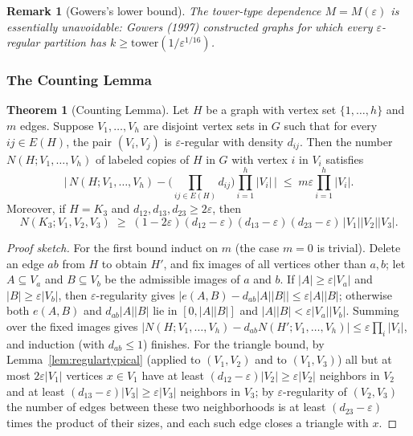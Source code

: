 \documentclass{article}
\newtheorem{remark}{Remark}
\theoremstyle{definition}
\newtheorem{theorem}{Theorem}
\begin{document}
\begin{remark}[Gowers's lower bound]
The tower-type dependence $M = M(\varepsilon)$ is essentially unavoidable:
Gowers (1997) constructed graphs for which every $\varepsilon$-regular
partition has $k \ge \mathrm{tower}(1/\varepsilon^{1/16})$.
\end{remark}

\subsubsection{The Counting Lemma}

\begin{theorem}[Counting Lemma]\label{thm:counting}
Let $H$ be a graph with vertex set $\{1, \dots, h\}$ and $m$ edges.
Suppose $V_1, \dots, V_h$ are disjoint vertex sets in $G$ such that for every
$ij \in E(H)$, the pair $(V_i, V_j)$ is $\varepsilon$-regular with density
$d_{ij}$. Then the number $N(H; V_1, \dots, V_h)$ of labeled copies of $H$
in $G$ with vertex $i$ in $V_i$ satisfies
\[
  \Bigg|\, N(H; V_1, \dots, V_h) -
     \Bigg( \prod_{ij \in E(H)} d_{ij} \Bigg) \prod_{i = 1}^{h} |V_i| \,\Bigg|
  \;\le\; m \varepsilon \prod_{i = 1}^{h} |V_i|.
\]
Moreover, if $H = K_3$ and $d_{12}, d_{13}, d_{23} \ge 2\varepsilon$, then
\[
  N(K_3; V_1, V_2, V_3) \;\ge\; (1 - 2\varepsilon)(d_{12} - \varepsilon)
     (d_{13} - \varepsilon)(d_{23} - \varepsilon)\, |V_1||V_2||V_3|.
\]
\end{theorem}

\begin{proof}[Proof sketch]
For the first bound induct on $m$ (the case $m = 0$ is trivial). Delete an
edge $ab$ from $H$ to obtain $H'$, and fix images of all vertices other
than $a, b$; let $A \subseteq V_a$ and $B \subseteq V_b$ be the admissible
images of $a$ and $b$. If $|A| \ge \varepsilon|V_a|$ and
$|B| \ge \varepsilon|V_b|$, then $\varepsilon$-regularity gives
$\big|e(A, B) - d_{ab}|A||B|\big| \le \varepsilon|A||B|$; otherwise both $e(A, B)$
and $d_{ab}|A||B|$ lie in $[0, |A||B|]$ and $|A||B| < \varepsilon|V_a||V_b|$.
Summing over the fixed images gives
$|N(H; V_1, \dots, V_h) - d_{ab} N(H'; V_1, \dots, V_h)| \le \varepsilon \prod_i |V_i|$,
and induction (with $d_{ab} \le 1$) finishes. For the triangle bound, by
Lemma~\ref{lem:regulartypical} (applied to $(V_1, V_2)$ and to $(V_1, V_3)$)
all but at most $2\varepsilon|V_1|$ vertices
$x \in V_1$ have at least $(d_{12} - \varepsilon)|V_2| \ge \varepsilon|V_2|$
neighbors in $V_2$ and at least $(d_{13} - \varepsilon)|V_3| \ge \varepsilon|V_3|$
neighbors in $V_3$; by $\varepsilon$-regularity of $(V_2, V_3)$ the number of
edges between these two neighborhoods is at least $(d_{23} - \varepsilon)$
times the product of their sizes, and each such edge closes a triangle with $x$.
\end{proof}
\end{document}
